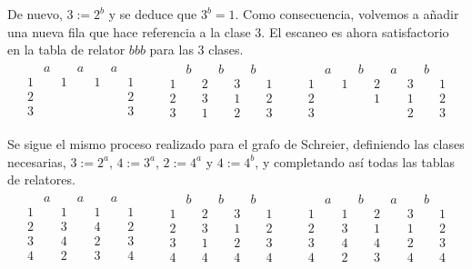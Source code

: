 De nuevo, $3:=2^b$ y se deduce que $3^b=1$. Como consecuencia, volvemos a añadir una nueva fila que hace referencia a la clase $3$. El escaneo es ahora satisfactorio en la tabla de relator $bbb$ para las $3$ clases.  
\begin{align*}
\begin{array}{ccccccc}
& a && a && a \\
\hline
1 && 1 && 1 && 1 \\
2 &&   &&   && 2 \\
3 &&   &&   && 3
\end{array}
\qquad
\begin{array}{ccccccc}
& b && b && b \\
\hline
1&& 2 && 3 && 1 \\
2&&3  && 1 && 2 \\
3&& 1 && 2 && 3
\end{array}
\qquad
\begin{array}{ccccccccc}
& a && b && a && b\\
\hline
1 && 1 && 2  && 3  && 1 \\
2 &&  && 1  && 1 && 2 \\
3 &&  &&    && 2 && 3
\end{array}
\end{align*}

Se sigue el mismo proceso realizado para el grafo de Schreier, definiendo las clases necesarias, $3:=2^a$, $4:=3^a$, $2:=4^a$ y $4:=4^b$, y completando así todas las tablas de relatores.
\begin{align*}
\begin{array}{ccccccc}
& a && a && a \\
\hline
1 && 1 && 1 && 1 \\
2 && 3  && 4  && 2 \\
3 && 4  &&  2 && 3 \\
4 &&  2 && 3  && 4
\end{array}
\qquad
\begin{array}{ccccccc}
& b && b && b \\
\hline
1&& 2 && 3 && 1 \\
2&&3  && 1 && 2 \\
3&& 1 && 2 && 3 \\
4&& 4 && 4 && 4
\end{array}
\qquad
\begin{array}{ccccccccc}
& a && b && a && b\\
\hline
1 && 1 && 2  && 3  && 1 \\
2 && 3 && 1  && 1 && 2 \\
3 && 4 &&  4  && 2 && 3 \\
4 && 2 &&  3  && 4 && 4
\end{array}
\end{align*}

